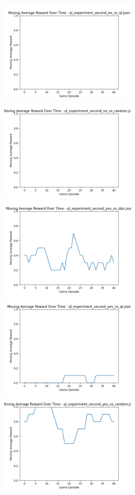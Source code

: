 \includegraphics[width=0.5\textwidth]{images/moving_average_reward_ql_experiment_second_no_vs_ql.png} 
\includegraphics[width=0.5\textwidth]{images/moving_average_reward_ql_experiment_second_no_vs_random.png} 
\includegraphics[width=0.5\textwidth]{images/moving_average_reward_ql_experiment_second_yes_vs_dqn.png} 
\includegraphics[width=0.5\textwidth]{images/moving_average_reward_ql_experiment_second_yes_vs_ql.png} 
\includegraphics[width=0.5\textwidth]{images/moving_average_reward_ql_experiment_second_yes_vs_random.png} 
